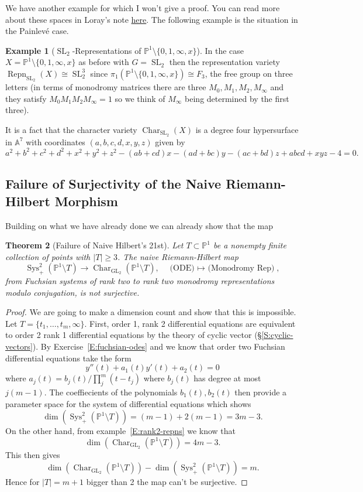 \documentclass[12pt]{book}
\numberwithin{equation}{section}
\newtheorem{theorem}{Theorem}[subsection]
\theoremstyle{definition}
\newtheorem{example}[theorem]{Example}
\theoremstyle{remark}
\renewcommand{\AA}{\mathbb{A}}
\newcommand{\PP}{\mathbb{P}}
\newcommand{\GL}{\operatorname{GL}}
\newcommand{\SL}{\operatorname{SL}}
\newcommand{\Sys}{\operatorname{Sys}}
\newcommand{\Repn}{\operatorname{Repn}}
\newcommand{\Char}{\operatorname{Char}}
\begin{document}
We have another example for which I won't give a proof. 
You can read more about these spaces in Loray's note \href{https://arxiv.org/pdf/1503.06781.pdf}{here}.
The following example is the situation in the Painlev\'e case.
\begin{example}[$\SL_2$-Representations of $\PP^1\setminus \lbrace 0,1,\infty, x\rbrace$]
	In the case $X = \PP^1\setminus \lbrace 0,1,\infty,x\rbrace$ as before with $G=\SL_2$ then the representation variety $\Repn_{\SL_2}(X)\cong \SL_2^3$ since $\pi_1(\PP^1\setminus \lbrace 0,1,\infty,x\rbrace) \cong F_3$, the free group on three letters (in terms of monodromy matrices there are three $M_0,M_1,M_2,M_{\infty}$ and they satisfy $M_0M_1M_2M_{\infty}=1$ so we think of $M_{\infty}$ being determined by the first three). 
	
	
	It is a fact that the character variety $\Char_{\SL_2}(X)$ is a degree four hypersurface in $\AA^7$ with coordinates $(a,b,c,d,x,y,z)$ given by 
	$$a^2+b^2+c^2+d^2 + x^2+y^2+z^2 -(ab+cd)x-(ad+bc)y-(ac+bd)z + abcd + xyz - 4 = 0.$$
\end{example}

\subsection{Failure of Surjectivity of the Naive Riemann-Hilbert Morphism}
Building on what we have already done we can already show that the map

\begin{theorem}[Failure of Naive Hilbert's 21st]\label{T:naive-rhc-false}
	Let $T \subset \PP^1$ be a nonempty finite collection of points with $\vert T \vert \geq 3$.
	The naive Riemann-Hilbert map
	 $$ \Sys_+^2( \PP^1\setminus T) \to \Char_{\GL_2}(\PP^1\setminus T), \quad \mbox{(ODE) $\mapsto$ (Monodromy Rep)},$$
	from Fuchsian systems of rank two to rank two monodromy representations modulo conjugation, is not surjective.
\end{theorem}
\begin{proof}
	We are going to make a dimension count and show that this is impossible. 
	Let $T = \lbrace t_1,\ldots,t_m,\infty\rbrace$.
	First, order 1, rank 2 differential equations are equivalent to order 2 rank 1 differential equations by the theory of cyclic vector (\S\ref{S:cyclic-vectors}). 
	By Exercise~\ref{E:fuchsian-odes} and we know that order two Fuchsian differential equations take the form 
	 $$ y''(t) + a_1(t)y'(t) + a_2(t) =0 $$
	where $a_j(t)=b_j(t)/\prod_j^m(t-t_j)$ where $b_j(t)$ has degree at most $j(m-1)$.
	The coeffiecients of the polynomials $b_1(t),b_2(t)$ then provide a parameter space for the system of differential equations which shows 
	 $$ \dim(\Sys_+^2( \PP^1\setminus T) ) = (m-1) + 2(m-1) = 3m-3.$$
	On the other hand, from example~\ref{E:rank2-repns} we know that 
	 $$ \dim( \Char_{\GL_2}(\PP^1\setminus T)) = 4m-3.$$
	This then gives 
	 $$\dim( \Char_{\GL_2}(\PP^1\setminus T))-\dim(\Sys_+^2( \PP^1\setminus T) ) = m.$$
	Hence for $\vert T\vert = m+1$ bigger than 2 the map can't be surjective.
\end{proof}
\end{document}
